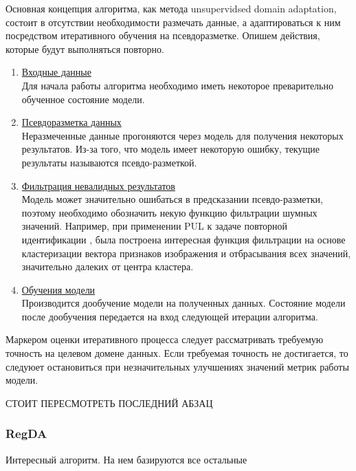 Основная концепция алгоритма, как метода unsupervidsed domain adaptation, состоит в отсутствии необходимости размечать данные, а адаптироваться к ним посредством итеративного обучения на псевдоразметке. Опишем действия, которые будут выполняться повторно.

\begin{enumerate}

\item \underline{Входные данные}\\
Для начала работы алгоритма необходимо иметь некоторое преварительно обученное состояние модели.

\item \underline{Псевдоразметка данных}\\ 
Неразмеченные данные прогоняются через модель для получения некоторых результатов. Из-за того, что модель имеет некоторую ошибку, текущие результаты называются псевдо-разметкой.

\item \underline{Фильтрация невалидных результатов}\\
Модель может значительно ошибаться в предсказании псевдо-разметки, поэтому необходимо обозначить некую функцию фильтрации шумных значений. Например, при применении PUL к задаче повторной идентификации \cite{pul_person}, была построена интересная функция фильтрации на основе кластеризации вектора признаков изображения и отбрасывания всех значений, значительно далеких от центра кластера.

\item \underline{Обучения модели}\\
Производится дообучение модели на полученных данных. Состояние модели после дообучения передается на вход следующей итерации алгоритма. 
\end{enumerate}

Маркером оценки итеративного процесса следует рассматривать требуемую точность на целевом домене данных. Если требуемая точность не достигается, то следуюет остановиться при незначительных улучшениях значений метрик работы модели.

СТОИТ ПЕРЕСМОТРЕТЬ ПОСЛЕДНИЙ АБЗАЦ

\subsubsection*{RegDA}

Интересный алгоритм. На нем базируются все остальные

\hfill \break

